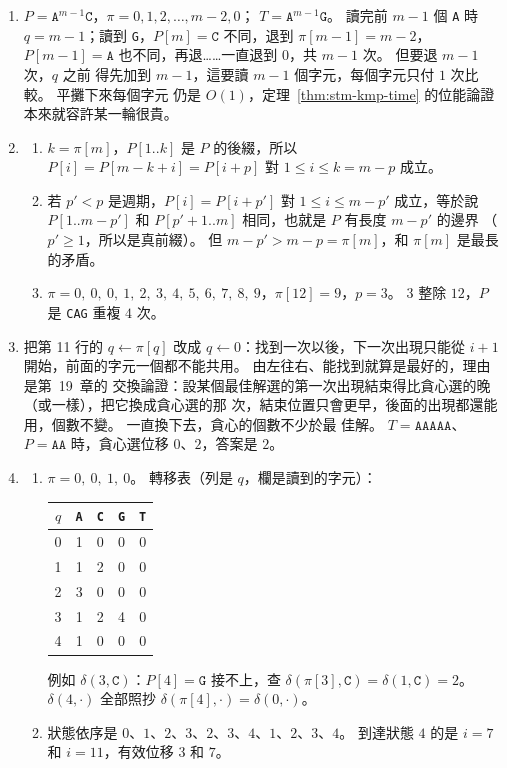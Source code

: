 \begin{enumerate}
\item $P = \mathtt{A}^{m-1}\mathtt{C}$，$\pi = 0, 1, 2, \ldots, m - 2, 0$；
$T = \mathtt{A}^{m-1}\mathtt{G}$。 讀完前 $m - 1$ 個 \texttt{A} 時 $q = m - 1$；讀到
\texttt{G}，$P[m] = \mathtt{C}$ 不同，退到 $\pi[m - 1] = m - 2$，$P[m - 1] =
\mathtt{A}$ 也不同，再退……一直退到 $0$，共 $m - 1$ 次。 但要退 $m - 1$ 次，$q$ 之前
得先加到 $m - 1$，這要讀 $m - 1$ 個字元，每個字元只付 $1$ 次比較。 平攤下來每個字元
仍是 $O(1)$，定理~\ref{thm:stm-kmp-time} 的位能論證本來就容許某一輪很貴。

\item
\begin{enumerate}
\item $k = \pi[m]$，$P[1..k]$ 是 $P$ 的後綴，所以 $P[i] = P[m - k + i] = P[i + p]$
對 $1 \le i \le k = m - p$ 成立。
\item 若 $p' < p$ 是週期，$P[i] = P[i + p']$ 對 $1 \le i \le m - p'$ 成立，等於說
$P[1..m - p']$ 和 $P[p' + 1 .. m]$ 相同，也就是 $P$ 有長度 $m - p'$ 的邊界
（$p' \ge 1$，所以是真前綴）。 但 $m - p' > m - p = \pi[m]$，和 $\pi[m]$ 是最長的矛盾。
\item $\pi = 0,\ 0,\ 0,\ 1,\ 2,\ 3,\ 4,\ 5,\ 6,\ 7,\ 8,\ 9$，$\pi[12] = 9$，$p = 3$。 $3$ 整除 $12$，$P$ 是
\texttt{CAG} 重複 $4$ 次。
\end{enumerate}

\item 把第 11 行的 $q \gets \pi[q]$ 改成 $q \gets 0$：找到一次以後，下一次出現只能從
$i + 1$ 開始，前面的字元一個都不能共用。 由左往右、能找到就算是最好的，理由是第~19~章的
交換論證：設某個最佳解選的第一次出現結束得比貪心選的晚（或一樣），把它換成貪心選的那
次，結束位置只會更早，後面的出現都還能用，個數不變。 一直換下去，貪心的個數不少於最
佳解。 $T = \mathtt{AAAAA}$、$P = \mathtt{AA}$ 時，貪心選位移 $0$、$2$，答案是 $2$。

\item
\begin{enumerate}
\item $\pi = 0,\ 0,\ 1,\ 0$。 轉移表（列是 $q$，欄是讀到的字元）：
\begin{center}
\small
\begin{tabular}{ccccc}
\toprule
$q$ & \texttt{A} & \texttt{C} & \texttt{G} & \texttt{T} \\
\midrule
0 & 1 & 0 & 0 & 0 \\
1 & 1 & 2 & 0 & 0 \\
2 & 3 & 0 & 0 & 0 \\
3 & 1 & 2 & 4 & 0 \\
4 & 1 & 0 & 0 & 0 \\
\bottomrule
\end{tabular}
\end{center}
例如 $\delta(3, \mathtt{C})$：$P[4] = \mathtt{G}$ 接不上，查 $\delta(\pi[3], \mathtt{C})
= \delta(1, \mathtt{C}) = 2$。 $\delta(4, \cdot)$ 全部照抄 $\delta(\pi[4], \cdot) =
\delta(0, \cdot)$。
\item 狀態依序是 $0$、$1$、$2$、$3$、$2$、$3$、$4$、$1$、$2$、$3$、$4$。 到達狀態 $4$ 的是 $i = 7$ 和 $i = 11$，有效位移
$3$ 和 $7$。
\end{enumerate}


\end{enumerate}
